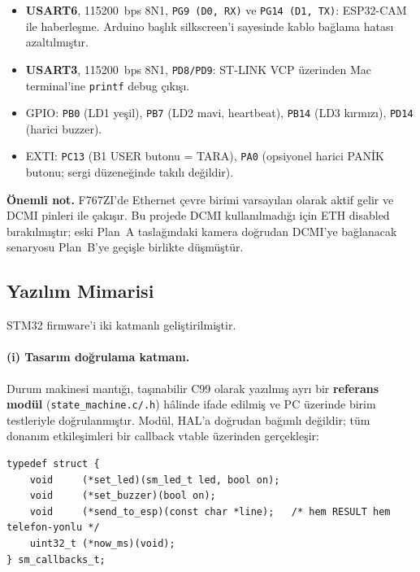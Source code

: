 \begin{itemize}
    \item \textbf{USART6}, 115200~bps 8N1, \texttt{PG9 (D0, RX)} ve
          \texttt{PG14 (D1, TX)}: ESP32-CAM ile haberleşme. Arduino
          başlık silkscreen'i sayesinde kablo bağlama hatası
          azaltılmıştır.
    \item \textbf{USART3}, 115200~bps 8N1, \texttt{PD8/PD9}: ST-LINK VCP
          üzerinden Mac terminal'ine \texttt{printf} debug çıkışı.
    \item GPIO: \texttt{PB0} (LD1 yeşil), \texttt{PB7} (LD2 mavi,
          heartbeat), \texttt{PB14} (LD3 kırmızı), \texttt{PD14}
          (harici buzzer).
    \item EXTI: \texttt{PC13} (B1 USER butonu = TARA), \texttt{PA0}
          (opsiyonel harici PANİK butonu; sergi düzeneğinde takılı
          değildir).
\end{itemize}

\textbf{Önemli not.} F767ZI'de Ethernet çevre birimi varsayılan olarak
aktif gelir ve DCMI pinleri ile çakışır. Bu projede DCMI kullanılmadığı
için ETH disabled bırakılmıştır; eski Plan~A taslağındaki kamera doğrudan
DCMI'ye bağlanacak senaryosu Plan~B'ye geçişle birlikte düşmüştür.

\subsection{Yazılım Mimarisi}

STM32 firmware'i iki katmanlı geliştirilmiştir.

\paragraph{(i) Tasarım doğrulama katmanı.}
Durum makinesi mantığı, taşınabilir C99 olarak yazılmış ayrı bir
\textbf{referans modül} (\texttt{state\_machine.c/.h}) hâlinde ifade
edilmiş ve PC üzerinde birim testleriyle doğrulanmıştır. Modül, HAL'a
doğrudan bağımlı değildir; tüm donanım etkileşimleri bir callback
vtable üzerinden gerçekleşir:

\begin{lstlisting}[language=none, caption={State machine referans modülünün callback vtable'ı.}, label=lst:cb]
typedef struct {
    void     (*set_led)(sm_led_t led, bool on);
    void     (*set_buzzer)(bool on);
    void     (*send_to_esp)(const char *line);   /* hem RESULT hem telefon-yonlu */
    uint32_t (*now_ms)(void);
} sm_callbacks_t;
\end{lstlisting}

